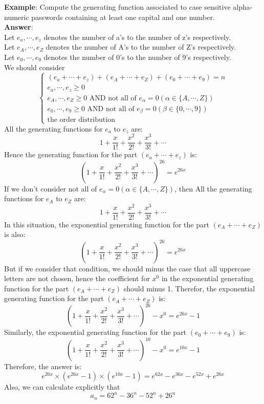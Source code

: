 \noindent \textbf{Example}: Compute the generating function associated to case sensitive alpha-numeric passwords containing at least one capital and one number.\\
\textbf{Answer}:\\
Let $e_a, \cdots ,e_z$ denotes the number of a's to the number of z's respectively.\\
Let $e_A, \cdots ,e_Z$ denotes the number of A's to the number of Z's respectively.\\
Let $e_0, \cdots ,e_9$ denotes the number of 0's to the number of 9's respectively.\\
We should consider
\begin{equation}
    \begin{cases}
        (e_a+ \cdots +e_z)+(e_A+ \cdots +e_Z)+(e_0+ \cdots +e_9)=n\\
        e_a, \cdots ,e_z \geq 0\\
        e_A, \cdots ,e_Z \geq 0 \text{ AND not all of } e_{\alpha}=0 (\alpha \in \{A, \cdots ,Z\})\\
        e_0, \cdots ,e_9 \geq 0 \text{ AND not all of } e_{\beta}=0 (\beta \in \{0, \cdots ,9\})\\
        \text{the order distribution}
    \end{cases}
\end{equation}
All the generating functions for $e_a$ to $e_z$ are:
$$1+\frac{x}{1!}+\frac{x^2}{2!}+\frac{x^3}{3!}+ \cdots$$
Hence the generating function for the part $(e_a+ \cdots +e_z)$ is:
$$(1+\frac{x}{1!}+\frac{x^2}{2!}+\frac{x^3}{3!}+ \cdots)^{26}=e^{26x}$$
If we don't consider not all of  $e_{\alpha}=0 (\alpha \in \{A, \cdots ,Z\})$, then All the generating functions for $e_A$ to $e_Z$ are:
$$1+\frac{x}{1!}+\frac{x^2}{2!}+\frac{x^3}{3!}+ \cdots$$
In this situation, the exponential generating function for the part $(e_A+ \cdots +e_Z)$ is also:
$$(1+\frac{x}{1!}+\frac{x^2}{2!}+\frac{x^3}{3!}+ \cdots)^{26}=e^{26x}$$
But if we consider that condition, we should minus the case that all uppercase letters are not chosen, hence the coefficient for $x^0$ in the exponential generating function for the part $(e_A+ \cdots +e_Z)$ should minus 1.
Therefor, the exponential generating function for the part $(e_A+ \cdots +e_Z)$ is:
$$(1+\frac{x}{1!}+\frac{x^2}{2!}+\frac{x^3}{3!}+ \cdots)^{26}-x^0=e^{26x}-1$$
Similarly, the exponential generating function for the part $(e_0+ \cdots +e_9)$ is:
$$(1+\frac{x}{1!}+\frac{x^2}{2!}+\frac{x^3}{3!}+ \cdots)^{10}-x^0=e^{10x}-1$$
Therefore, the answer is:
$$e^{26x}\times (e^{26x}-1)\times (e^{10x}-1)=e^{62x}-e^{36x}-e^{52x}+e^{26x}$$
Also, we can calculate explicitly that $$a_n=62^n-36^n-52^n+26^n$$

